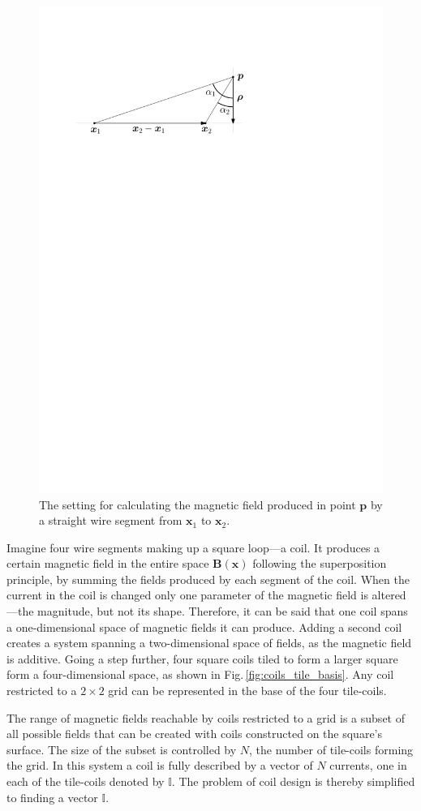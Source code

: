 \begin{figure}
  \centering
  \includegraphics[width=0.6\linewidth]{gfx/coils/biot_savart.pdf}
  \caption{The setting for calculating the magnetic field produced in point $\mathbf{p}$ by a straight wire segment from $\mathbf{x}_1$ to $\mathbf{x}_2$.}\label{fig:biot-savart}
\end{figure}

Imagine four wire segments making up a square loop---a coil.
It produces a certain magnetic field in the entire space $\mathbf{B}(\mathbf{x})$ following the superposition principle, by summing the fields produced by each segment of the coil.
When the current in the coil is changed only one parameter of the magnetic field is altered---the magnitude, but not its shape.
Therefore, it can be said that one coil spans a one-dimensional space of magnetic fields it can produce.
Adding a second coil creates a system spanning a two-dimensional space of fields, as the magnetic field is additive. Going a step further, four square coils tiled to form a larger square form a four-dimensional space, as shown in Fig.\,\ref{fig:coils_tile_basis}.
Any coil restricted to a $2 \times 2$ grid can be represented in the base of the four tile-coils.

The range of magnetic fields reachable by coils restricted to a grid is a subset of all possible fields that can be created with coils constructed on the square's surface. The size of the subset is controlled by $N$, the number of tile-coils forming the grid.
In this system a coil is fully described by a vector of $N$ currents, one in each of the tile-coils denoted by $\mathbb{I}$. The problem of coil design is thereby simplified to finding a vector $\mathbb{I}$.

